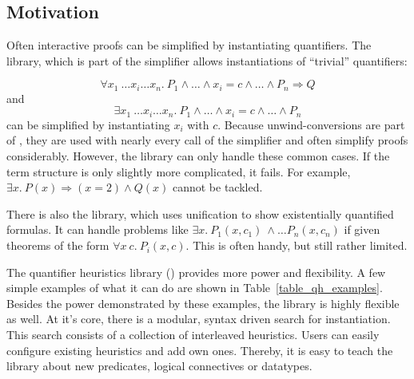 
\setcounter{sessioncount}{0}

\subsection{Motivation}

Often interactive proofs can be simplified by instantiating
quantifiers. The  library, which is part of the simplifier allows
instantiations of ``trivial'' quantifiers:

\[ \forall x_1\ \ldots x_i \ldots x_n.\ P_1 \wedge \ldots \wedge x_i = c \wedge \ldots \wedge P_n \Longrightarrow Q \]
and
\[ \exists x_1\ \ldots x_i \ldots x_n.\ P_1 \wedge \ldots \wedge x_i =
c \wedge \ldots \wedge P_n \] can be simplified by
instantiating $x_i$ with $c$. Because unwind-conversions are 
part of , they are used with nearly every call of the simplifier
and often simplify proofs considerably. However, the  library can only handle these common cases. If the term structure is
only slightly more complicated, it fails. For example, $\exists x.\ P(x) \Longrightarrow (x = 2) \wedge Q(x)$
cannot be tackled.

There is also the  library, which uses
unification to show existentially quantified formulas. It can handle
problems like $\exists x.\ P_1(x,c_1)\ \wedge \ldots P_n(x,c_n)$ if
given theorems of the form $\forall x\ c.\ P_i(x, c)$. This is often
handy, but still rather limited.

The quantifier heuristics library () provides more power
and flexibility. A few simple examples of what it can do
are shown in Table~\ref{table_qh_examples}. Besides the power demonstrated
by these examples, the library is highly flexible as well.  At it's
core, there is a modular, syntax driven search for instantiation.
This search consists of a collection of interleaved heuristics.  Users
can easily configure existing heuristics and add own ones. Thereby, it
is easy to teach the library about new predicates, logical connectives
or datatypes.

